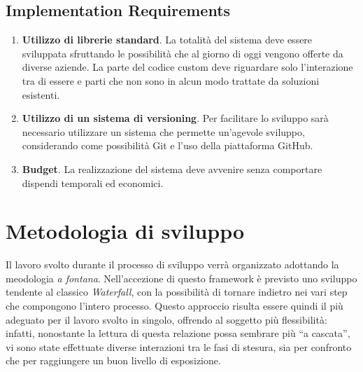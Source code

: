 \documentclass[12pt,a4paper,openright,oneside]{report}
\newcommand{\quotes}[1]{``#1''}
\begin{document}
\subsection{Implementation Requirements}
\begin{enumerate}[label*=\arabic*.]
	\item \textbf{Utilizzo di librerie standard}. La totalità del sistema deve essere sviluppata sfruttando le possibilità che al giorno di oggi vengono offerte da diverse aziende. La parte del codice custom deve riguardare solo l'interazione tra di essere e parti che non sono in alcun modo trattate da soluzioni esistenti.
	
	
	\item \textbf{Utilizzo di un sistema di versioning}. Per facilitare lo sviluppo sarà necessario utilizzare un sistema che permette un'agevole sviluppo, considerando come possibilità Git e l'uso della piattaforma GitHub.
	
	\item \textbf{Budget}. La realizzazione del sistema deve avvenire senza comportare dispendi temporali ed economici.
\end{enumerate}


\section{Metodologia di sviluppo}
\label{sec:Metodologia}
Il lavoro svolto durante il processo di sviluppo verrà organizzato adottando la meodologia \textit{a fontana}. Nell'accezione di questo framework è previsto uno sviluppo tendente al classico \textit{Waterfall}, con la possibilità di tornare indietro nei vari step che compongono l'intero processo. Questo approccio risulta essere quindi il più adeguato per il lavoro svolto in singolo, offrendo al soggetto più flessibilità: infatti, nonostante la lettura di questa relazione possa sembrare più \quotes{a cascata}, vi sono state effettuate diverse interazioni tra le fasi di stesura, sia per confronto che per raggiungere un buon livello di esposizione.
\end{document}
